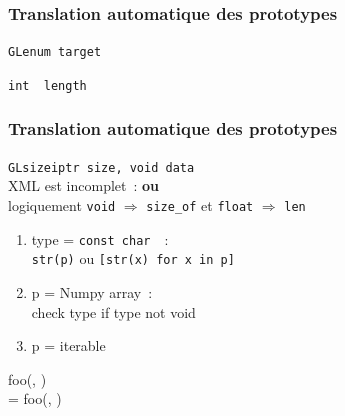 \begin{frame}
  \frametitle{Translation automatique des prototypes}
  \begin{description}
    \item[simple] \texttt{GLenum target} \\
    \item[output par référence] \texttt{int \alert{\ptr [1]} length} \\
  \end{description}
\end{frame}

\begin{frame}
  \frametitle{Translation automatique des prototypes}
  \begin{description}
    \item[input via pointeur] \texttt{GLsizeiptr size,  void  data} \\
      \attention{} \alert{XML est incomplet~:  \textbf{ou} } \\
      logiquement \texttt{void} $\Longrightarrow$ \texttt{size\_of} et \texttt{float} $\Longrightarrow$ \texttt{len}
      \begin{enumerate}
      \item type = \texttt{const char \ptr\ptr}~:\\
        \texttt{str(p)} ou \texttt{[str(x) for x in p]}
      \item p = Numpy array~:\\
        check type if type not void
      \item p = iterable
      \end{enumerate}
       foo(, ) \\
       = foo(, )
  \end{description}
\end{frame}


